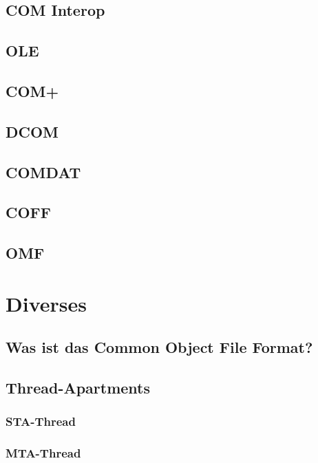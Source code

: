 \begin{multicols}{3}
\subsection{COM Interop}
\lipsum[1]

\subsection{OLE}
\lipsum[1]

\subsection{COM+}
\lipsum[1]

\subsection{DCOM}
\lipsum[1]

\subsection{COMDAT}
\lipsum[1]
\subsection{COFF}
\lipsum[1]
\subsection{OMF}
\lipsum[1]
\section{Diverses}

\subsection{Was ist das Common Object File Format?}
\lipsum[1]

\subsection{Thread-Apartments}

\subsubsection{STA-Thread}
\lipsum[1]

\subsubsection{MTA-Thread}
\lipsum[1]


\end{multicols}
